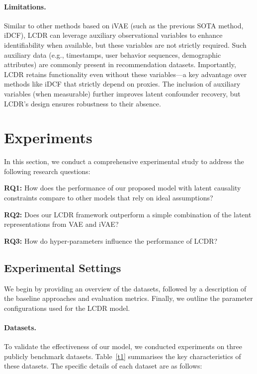 \documentclass[sigconf]{acmart}
\begin{document}
\paragraph{Limitations.}
Similar to other methods  based on iVAE (such as the previous SOTA method, iDCF), LCDR can leverage auxiliary observational variables to enhance identifiability when available, but these variables are not strictly required. Such auxiliary data (e.g., timestamps, user behavior sequences, demographic attributes) are commonly present in recommendation datasets. Importantly, LCDR retains functionality even without these variables—a key advantage over methods like iDCF that strictly depend on proxies. The inclusion of auxiliary variables (when measurable) further improves latent confounder recovery, but LCDR’s design ensures robustness to their absence.



\section{Experiments}

In this section, we conduct a comprehensive experimental study to address the following research questions:

\textbf{RQ1:}  How does the performance of our proposed model with latent causality constraints compare to other models that rely on ideal assumptions?

\textbf{RQ2:} Does our LCDR framework outperform a simple combination of the latent representations from VAE and iVAE?

\textbf{RQ3:} How do hyper-parameters influence the performance of LCDR?

\vspace{10pt}

\subsection{Experimental Settings}
We begin by providing an overview of the datasets, followed by a description of the baseline approaches and evaluation metrics. Finally, we outline the parameter configurations used for the LCDR model.

\paragraph{Datasets.}
To validate the effectiveness of our model, we conducted experiments on three publicly benchmark datasets. Table~\ref{t1} summarises the key characteristics of these datasets. The specific details of each dataset are as follows:
\end{document}
